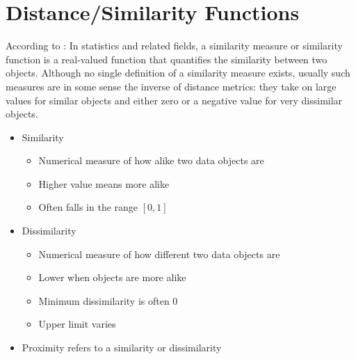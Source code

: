 \section{Distance/Similarity Functions}
According to \cite{enwiki:similarity}:
\medskip
In statistics and related fields, a similarity measure or similarity function is 
a real-valued function that quantifies the similarity between two objects. 
Although no single definition of a similarity measure exists, usually such 
measures are in some sense the inverse of distance metrics: they take on large 
values for similar objects and either zero or a negative value for very 
dissimilar objects. 

\begin{itemize}
    \item Similarity
    \begin{itemize}
        \item Numerical measure of how alike two data objects are
        \item Higher value means more alike
        \item Often falls in the range $[0,1]$
    \end{itemize}
    \item Dissimilarity
    \begin{itemize}
        \item Numerical measure of how different two data objects are
        \item Lower when objects are more alike
        \item Minimum dissimilarity is often 0
        \item Upper limit varies
    \end{itemize}
    \item Proximity refers to a similarity or dissimilarity
\end{itemize}

